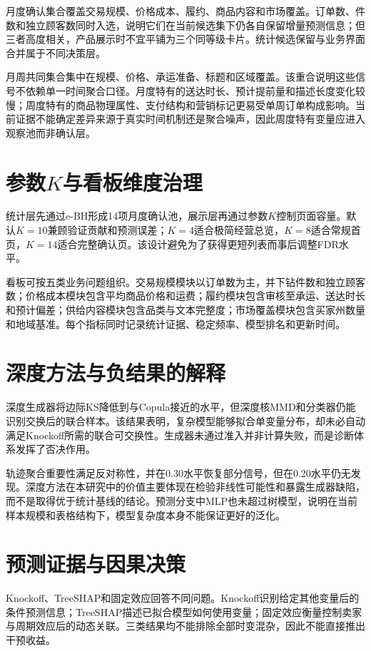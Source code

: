\documentclass{sufethesismas}
\begin{document}
月度确认集合覆盖交易规模、价格成本、履约、商品内容和市场覆盖。订单数、件数和独立顾客数同时入选，说明它们在当前候选集下仍各自保留增量预测信息；但三者高度相关，产品展示时不宜平铺为三个同等级卡片。统计候选保留与业务界面合并属于不同决策层。

月周共同集合集中在规模、价格、承运准备、标题和区域覆盖。该重合说明这些信号不依赖单一时间聚合口径。月度特有的送达时长、预计提前量和描述长度变化较慢；周度特有的商品物理属性、支付结构和营销标记更易受单周订单构成影响。当前证据不能确定差异来源于真实时间机制还是聚合噪声，因此周度特有变量应进入观察池而非确认层。

\section{\texorpdfstring{参数\(K\)与看板维度治理}{参数K与看板维度治理}}

统计层先通过e-BH形成14项月度确认池，展示层再通过参数\(K\)控制页面容量。默认\(K=10\)兼顾验证贡献和预测误差；\(K=4\)适合极简经营总览，\(K=8\)适合常规首页，\(K=14\)适合完整确认页。该设计避免为了获得更短列表而事后调整FDR水平。

看板可按五类业务问题组织。交易规模模块以订单数为主，并下钻件数和独立顾客数；价格成本模块包含平均商品价格和运费；履约模块包含审核至承运、送达时长和预计偏差；供给内容模块包含品类与文本完整度；市场覆盖模块包含买家州数量和地域基准。每个指标同时记录统计证据、稳定频率、模型排名和更新时间。

\section{深度方法与负结果的解释}

深度生成器将边际KS降低到与Copula接近的水平，但深度核MMD和分类器仍能识别交换后的联合样本。该结果表明，复杂模型能够拟合单变量分布，却未必自动满足Knockoff所需的联合可交换性。生成器未通过准入并非计算失败，而是诊断体系发挥了否决作用。

轨迹聚合重要性满足反对称性，并在0.30水平恢复部分信号，但在0.20水平仍无发现。深度方法在本研究中的价值主要体现在检验非线性可能性和暴露生成器缺陷，而不是取得优于统计基线的结论。预测分支中MLP也未超过树模型，说明在当前样本规模和表格结构下，模型复杂度本身不能保证更好的泛化。

\section{预测证据与因果决策}

Knockoff、TreeSHAP和固定效应回答不同问题。Knockoff识别给定其他变量后的条件预测信息；TreeSHAP描述已拟合模型如何使用变量；固定效应衡量控制卖家与周期效应后的动态关联。三类结果均不能排除全部时变混杂，因此不能直接推出干预收益。
\end{document}
